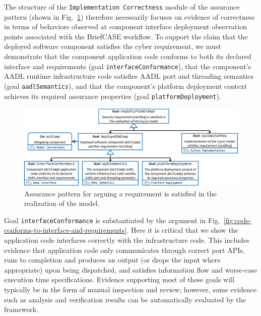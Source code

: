 The structure of the \texttt{Implementation Correctness} module of the assurance pattern (shown in Fig.~\ref{fig:req-satisfied-in-model-realization}) therefore necessarily focuses on evidence of correctness in terms of behaviors observed at component interface deployment observation points associated with the BriefCASE workflow. 
%
To support the claim that the deployed software component satisfies the cyber requirement, we must demonstrate that the component application code conforms to both its declared interface and requirements (goal \texttt{interfaceConformance}), that the component's AADL runtime infrastructure code satisfies AADL port and threading semantics (goal \texttt{aadlSemantics}), and that the component's platform deployment context achieves its required assurance properties (goal \texttt{platformDeployment}).

\begin{figure}[h] 
	\centering 
	\includegraphics[width=\textwidth]{figs/req-satisfied-in-model-realization.png}
	\caption{Assurance pattern for arguing a requirement is satisfied in the realization of the model.}
	\label{fig:req-satisfied-in-model-realization} 
\end{figure}

Goal \texttt{interfaceConformance} is substantiated by the argument in Fig.~\ref{fig:code-conforms-to-interface-and-requirements}.  Here it is critical that we show the application code interfaces correctly with the infrastructure code.  This includes evidence that application code only communicates through correct port APIs, runs to completion and produces an output (or drops the input where appropriate) upon being dispatched, and satisfies information flow and worse-case execution time specifications.  Evidence supporting most of these goals will typically be in the form of manual inspection and review; however, some evidence such as analysis and verification results can be automatically evaluated by the framework.

